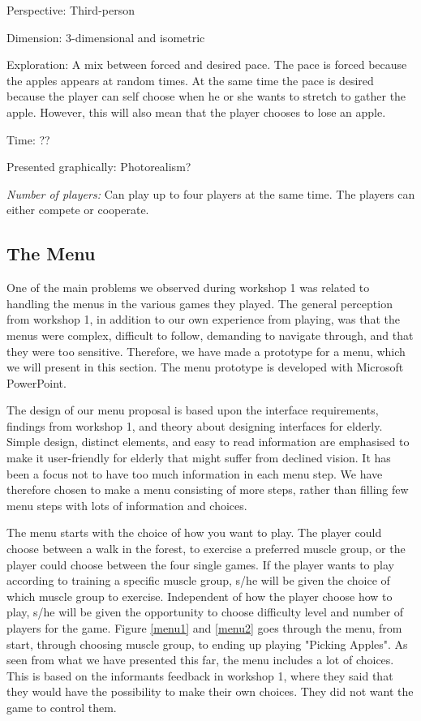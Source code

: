 Perspective: Third-person 

Dimension: 3-dimensional and isometric

Exploration: A mix between forced and desired pace. The pace is forced because the apples appears at random times. At the same time the pace is desired because the player can self choose when he or she wants to stretch to gather the apple. However, this will also mean that the player chooses to lose an apple. 

Time: ??

Presented graphically: Photorealism?

\emph{Number of players:} Can play up to four players at the same time. The players can either compete or cooperate. 



\subsection{The Menu}
\label{sec:menu}

One of the main problems we observed during workshop 1 was related to handling the menus in the various games they played. The general perception from workshop 1, in addition to our own experience from playing, was that the menus were complex, difficult to follow, demanding to navigate through, and that they were too sensitive. Therefore, we have made a prototype for a menu, which we will present in this section. The menu prototype is developed with Microsoft PowerPoint.

The design of our menu proposal is based upon the interface requirements, findings from workshop 1, and theory about designing interfaces for elderly. Simple design, distinct elements, and easy to read information are emphasised to make it user-friendly for elderly that might suffer from declined vision. It has been a focus not to have too much information in each menu step. We have therefore chosen to make a menu consisting of more steps, rather than filling few menu steps with lots of information and choices.   

The menu starts with the choice of how you want to play. The player could choose between a walk in the forest, to exercise a preferred muscle group, or the player could choose between the four single games. If the player wants to play according to training a specific muscle group, s/he will be given the choice of which muscle group to exercise. Independent of how the player choose how to play, s/he will be given the opportunity to choose difficulty level and number of players for the game. Figure \ref{menu1} and \ref{menu2} goes through the menu, from start, through choosing muscle group, to ending up playing "Picking Apples". As seen from what we have presented this far, the menu includes a lot of choices. This is based on the informants feedback in workshop 1, where they said that they would have the possibility to make their own choices. They did not want the game to control them.   

